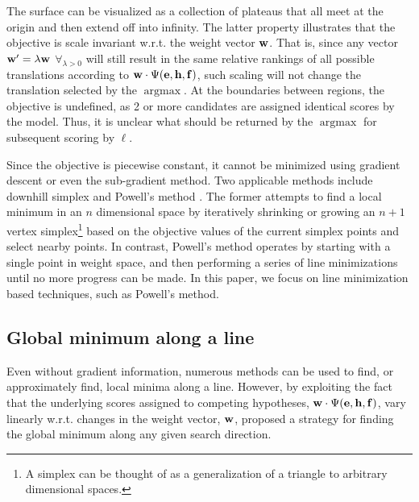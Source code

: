 \documentclass[11pt,tightenlines,kern-1pt]{article}
\DeclareMathOperator*{\argmax}{argmax}
\begin{document}
The surface can be visualized as a collection of plateaus that all meet at the origin and then extend off into infinity. The latter property illustrates that the objective is scale invariant w.r.t\@. the weight vector \mbox{${\bf w}$}. That is, since any vector \mbox{${\bf w}^\prime = \lambda {\bf w}$} \mbox{$\forall_{\lambda > 0}$} will still result in the same relative rankings of all possible translations according to \mbox{${\bf w} \cdot \Psi({\bf e}, {\bf h}, {\bf f})$}, such scaling will not change the translation selected by the \mbox{$\argmax$}. At the boundaries between regions, the objective is undefined, as
2 or more candidates are assigned identical scores by the model. Thus, it is unclear what should be returned by the \mbox{$\argmax$} for subsequent scoring by \mbox{$\ell$}.

Since the objective is piecewise constant, it cannot be minimized using gradient descent or even the sub-gradient method. Two applicable methods include downhill simplex and Powell's method \cite{press2007}. The former attempts to find a local minimum in an \mbox{$n$} dimensional space by iteratively shrinking or growing an \mbox{$n+1$} vertex simplex\footnote{A simplex can be thought of as a generalization of a triangle to arbitrary dimensional spaces.} based on the objective values of the current simplex points 
and select nearby points. In contrast, Powell's method operates by starting with a single point in weight space, and then performing a series of line minimizations until no more progress can be made. In this paper, we focus on line minimization based techniques, such as Powell's method.  

\subsection{Global minimum along a line}

Even without gradient information, numerous methods can be used to find, or approximately find, local minima along a line. However, by exploiting the fact that the underlying scores assigned to competing hypotheses,  \mbox{${\bf w} \cdot \Psi({\bf e}, {\bf h}, {\bf f})$}, vary linearly w.r.t\@. changes in the weight vector, \mbox{${\bf w}$},  proposed a strategy for finding the global minimum along any given search direction. 
\end{document}

